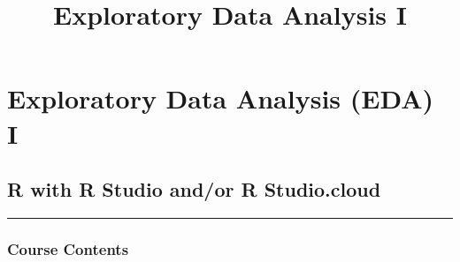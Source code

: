 \documentclass[
]{article}
\title{Exploratory Data Analysis I}
\author{}
\date{\vspace{-2.5em}}
\begin{document}
\maketitle

\hypertarget{exploratory-data-analysis-eda-i}{%
\section{Exploratory Data Analysis (EDA)
I}\label{exploratory-data-analysis-eda-i}}

\hypertarget{r-with-r-studio-andor-r-studio.cloud}{%
\subsection{R with R Studio and/or R
Studio.cloud}\label{r-with-r-studio-andor-r-studio.cloud}}

\begin{center}\rule{0.5\linewidth}{0.5pt}\end{center}

\hypertarget{course-contents}{%
\subsubsection{Course Contents}\label{course-contents}}
\end{document}
